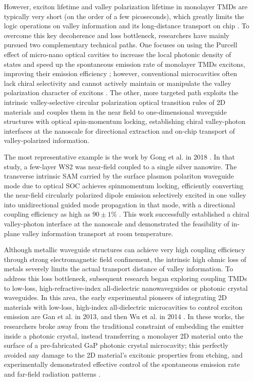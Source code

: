 However, exciton lifetime and valley polarization lifetime in monolayer TMDs are typically very short (on the order of a few picoseconds), which greatly limits the logic operations on valley information and its long-distance transport on chip \cite{schaibley2016valleytronics, gong2018nanoscale}. To overcome this key decoherence and loss bottleneck, researchers have mainly pursued two complementary technical paths. One focuses on using the Purcell effect of micro-nano optical cavities to increase the local photonic density of states and speed up the spontaneous emission rate of monolayer TMDs excitons, improving their emission efficiency \cite{mak2016photonics, gan2013controlling}; however, conventional microcavities often lack chiral selectivity and cannot actively maintain or manipulate the valley polarization character of excitons \cite{mak2016photonics}. The other, more targeted path exploits the intrinsic valley-selective circular polarization optical transition rules of 2D materials \cite{xiao2012coupled} and couples them in the near field to one-dimensional waveguide structures with optical spin-momentum locking, establishing chiral valley-photon interfaces at the nanoscale for directional extraction and on-chip transport of valley-polarized information.

The most representative example is the work by Gong et al. in 2018 \cite{gong2018nanoscale}. In that study, a few-layer WS2 was near-field coupled to a single silver nanowire. The transverse intrinsic SAM carried by the surface plasmon polariton waveguide mode due to optical SOC achieves spinmomentum locking, efficiently converting the near-field circularly polarized dipole emission selectively excited in one valley into unidirectional guided mode propagation in that mode, with a directional coupling efficiency as high as $90 \pm 1\%$ . This work successfully established a chiral valley-photon interface at the nanoscale and demonstrated the feasibility of in-plane valley information transport at room temperature.

Although metallic waveguide structures can achieve very high coupling efficiency through strong electromagnetic field confinement, the intrinsic high ohmic loss of metals severely limits the actual transport distance of valley information. To address this loss bottleneck, subsequent research began exploring coupling TMDs to low-loss, high-refractive-index all-dielectric nanowaveguides or photonic crystal waveguides. In this area, the early experimental pioneers of integrating 2D materials with low-loss, high-index all-dielectric microcavities to control exciton emission are Gan et al. in 2013, and then Wu et al. in 2014 \cite{gan2013controlling, Wu2014control}. In these works, the researchers broke away from the traditional constraint of embedding the emitter inside a photonic crystal, instead transferring a monolayer 2D material onto the surface of a pre-fabricated GaP photonic crystal microcavity; this perfectly avoided any damage to the 2D material's excitonic properties from etching, and experimentally demonstrated effective control of the spontaneous emission rate and far-field radiation patterns \cite{gan2013controlling, Wu2014control}.

